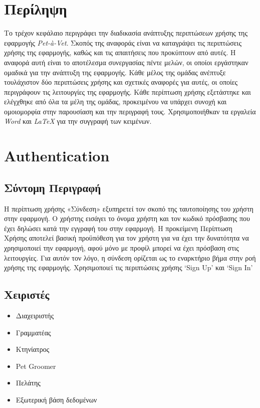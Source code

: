 \documentclass[12pt,a4paper,twoside]{book}
\begin{document}
\section{Περίληψη}

Το τρέχον κεφάλαιο περιγράφει την διαδικασία ανάπτυξης περιπτώσεων χρήσης της εφαρμογής \textit{Pet-à-Vet}. Σκοπός της αναφοράς είναι να καταγράψει τις περιπτώσεις χρήσης της εφαρμογής, καθώς και τις απαιτήσεις που προκύπτουν από αυτές. Η αναφορά αυτή είναι το αποτέλεσμα συνεργασίας πέντε μελών, οι οποίοι εργάστηκαν ομαδικά για την ανάπτυξη της εφαρμογής. Κάθε μέλος της ομάδας ανέπτυξε τουλάχιστον δύο περιπτώσεις χρήσης και σχετικές αναφορές για αυτές, οι οποίες περιγράφουν τις λειτουργίες της εφαρμογής. Κάθε περίπτωση χρήσης εξετάστηκε και ελέγχθηκε από όλα τα μέλη της ομάδας, προκειμένου να υπάρχει συνοχή και ομοιομορφία στην παρουσίαση και την περιγραφή τους. Χρησιμοποιήθκαν τα εργαλεία \textit{Word} και \textit{LaTeX} για την συγγραφή των κειμένων. %

\section{Authentication}

\subsection{Σύντομη Περιγραφή}
Η περίπτωση χρήσης «Σύνδεση» εξυπηρετεί τον σκοπό της ταυτοποίησης του χρήστη στην εφαρμογή. Ο χρήστης εισάγει το όνομα χρήστη και τον κωδικό πρόσβασης που έχει δηλώσει κατά την εγγραφή του στην εφαρμογή. Η προκείμενη Περίπτωση Χρήσης αποτελεί βασική προϋπόθεση για τον χρήστη για να έχει την δυνατότητα να χρησιμοποιεί την εφαρμογή, αφού μόνο με προφίλ μπορεί να έχει πρόσβαση στις λειτουργίες. Για αυτόν τον λόγο, η σύνδεση ορίζεται ως το εναρκτήριο βήμα στην ροή χρήσης της εφαρμογής. Χρησιμοποιεί τις περιπτώσεις χρήσης `Sign Up' και `Sign In' %

\subsection{Χειριστές}
\begin{itemize}
  \item Διαχειριστής
  \item Γραμματέας
  \item Κτηνίατρος
  \item Pet Groomer
  \item Πελάτης
  \item Εξωτερική βάση δεδομένων %
\end{itemize}
\end{document}
